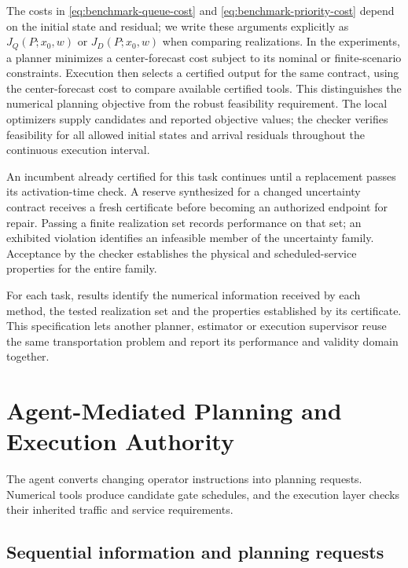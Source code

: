 \documentclass[journal,10pt]{IEEEtran}
\begin{document}
The costs in \eqref{eq:benchmark-queue-cost} and
\eqref{eq:benchmark-priority-cost} depend on the initial state and residual;
we write these arguments explicitly as $J_Q(P;x_0,w)$ or $J_D(P;x_0,w)$
when comparing realizations. In the experiments, a planner minimizes a
center-forecast cost subject to its nominal or finite-scenario constraints.
Execution then selects a certified output for the same contract, using
the center-forecast cost to compare available certified tools. This
distinguishes the numerical planning objective from the robust feasibility
requirement. The local optimizers supply candidates and reported objective
values; the checker verifies feasibility for all allowed initial states and arrival
residuals throughout the continuous execution interval.

An incumbent already certified for this task continues until a replacement
passes its activation-time check. A reserve synthesized for a changed
uncertainty contract receives a fresh certificate before becoming an
authorized endpoint for repair. Passing a finite realization set records
performance on that set; an exhibited violation identifies an infeasible
member of the uncertainty family. Acceptance by the checker establishes
the physical and scheduled-service properties for the entire family.

For each task, results identify the numerical information received by each
method, the tested realization set and the properties established by its
certificate. This specification lets another planner, estimator or execution
supervisor reuse the same transportation problem and report its performance
and validity domain together.

\section{Agent-Mediated Planning and Execution Authority}
\label{sec:new-agent}

The agent converts changing operator instructions into planning requests.
Numerical tools produce candidate gate schedules, and the execution layer
checks their inherited traffic and service requirements.

\subsection{Sequential information and planning requests}
\end{document}
